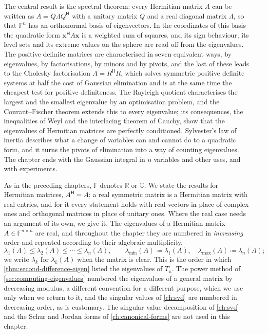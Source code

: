 The central result is the spectral theorem: every Hermitian matrix $A$ can be written as $A=Q\Lambda Q^{\mathsf H}$ with a unitary matrix $Q$ and a real diagonal matrix $\Lambda$, so that $\mathbb F^n$ has an orthonormal basis of eigenvectors. In the coordinates of this basis the quadratic form $\mathbf x^{\mathsf H}A\mathbf x$ is a weighted sum of squares, and its sign behaviour, its level sets and its extreme values on the sphere are read off from the eigenvalues. The positive definite matrices are characterised in seven equivalent ways, by eigenvalues, by factorisations, by minors and by pivots, and the last of these leads to the Cholesky factorisation $A=R^{\mathsf H}R$, which solves symmetric positive definite systems at half the cost of Gaussian elimination and is at the same time the cheapest test for positive definiteness. The Rayleigh quotient characterises the largest and the smallest eigenvalue by an optimisation problem, and the Courant--Fischer theorem extends this to every eigenvalue; its consequences, the inequalities of Weyl and the interlacing theorem of Cauchy, show that the eigenvalues of Hermitian matrices are perfectly conditioned. Sylvester's law of inertia describes what a change of variables can and cannot do to a quadratic form, and it turns the pivots of elimination into a way of counting eigenvalues. The chapter ends with the Gaussian integral in $n$ variables and other uses, and with experiments.

As in the preceding chapters, $\mathbb F$ denotes $\mathbb R$ or $\mathbb C$. We state the results for Hermitian matrices, $A^{\mathsf H}=A$; a real symmetric matrix is a Hermitian matrix with real entries, and for it every statement holds with real vectors in place of complex ones and orthogonal matrices in place of unitary ones. Where the real case needs an argument of its own, we give it. The eigenvalues of a Hermitian matrix $A\in\mathbb F^{n\times n}$ are real, and throughout the chapter they are numbered in \emph{increasing} order and repeated according to their algebraic multiplicity,
\[
\lambda_1(A)\le\lambda_2(A)\le\cdots\le\lambda_n(A),\qquad\lambda_{\min}(A)\coloneqq\lambda_1(A),\quad\lambda_{\max}(A)\coloneqq\lambda_n(A);
\]
we write $\lambda_k$ for $\lambda_k(A)$ when the matrix is clear. This is the order in which \cref{thm:second-difference-eigen} listed the eigenvalues of $T_n$. The power method of \cref{sec:computing-eigenvalues} numbered the eigenvalues of a general matrix by decreasing modulus, a different convention for a different purpose, which we use only when we return to it, and the singular values of \cref{ch:svd} are numbered in decreasing order, as is customary. The singular value decomposition of \cref{ch:svd} and the Schur and Jordan forms of \cref{ch:canonical-forms} are not used in this chapter.

